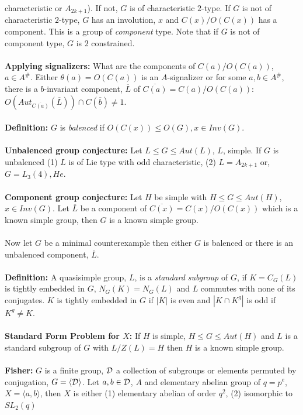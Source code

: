 characteristic or $A_{2k+1}$).  If not, $G$ is of characteristic $2$-type.  If $G$ is not of characteristic $2$-type, $G$
has an involution, $x$ and $C(x)/O(C(x))$ has a component.  This is a group of \emph{component} type.  Note that if
$G$ is not of component type, $G$ is $2$ constrained.
\\
\\
{\bf Applying signalizers:}  What are the components of $C(a)/O(C(a))$, $a \in A^{\#}$.  Either $\theta(a)=O(C(a))$ is
an $A$-signalizer or for some $a,b \in A^{\#}$, there is a $b$-invariant component, ${\overline L}$ of
${\overline {C(a)}}= C(a)/O(C(a))$: $O(Aut_{\overline {C(a)}}({\overline L})) \cap C({\overline b}) \ne 1$.
\\
\\
{\bf Definition:} $G$ is \emph{balenced} if $O(C(x)) \leq O(G), x \in Inv(G)$.\\
\\
{\bf Unbalenced group conjecture:} Let $L \leq G \leq Aut(L)$, $L$, simple.   If $G$ is unbalenced
(1) $L$ is of Lie type with odd characteristic, (2) $L=A_{2k+1}$ or, $G=L_3(4), He$.
\\
\\
{\bf Component group conjecture:} Let $H$ be simple with $H \leq G \leq Aut(H)$, $x \in Inv(G)$.  Let ${\overline L}$
be a component of ${\overline {C(x)}} = C(x)/O(C(x))$ which is a known simple group, then $G$ is a known simple group.\\
\\
Now let $G$ be a minimal counterexample then either $G$ is balenced or there is an unbalenced component, ${\overline L}$.
\\
\\
{\bf Definition:} A quasisimple group, $L$, is a \emph{standard subgroup} of $G$, if $K=C_G(L)$ is
tightly embedded in $G$, $N_G(K)=N_G(L)$ and $L$ commutes with none of its conjugates.
$K$ is tightly embedded in $G$ if $|K|$ is even and $|K \cap K^g|$ is odd if $K^g \ne K$.
\\
\\
{\bf Standard Form Problem for $X$:}  If $H$ is simple, $H \leq G \leq Aut(H)$ and $L$ is a standard subgroup of $G$
with $L/Z(L) = H$ then $H$ is a known simple group.
\\
\\
{\bf Fisher:} $G$ is a finite group, ${\cal D}$ a collection of subgroups or elements permuted by conjugation, 
$G = \langle {\cal D} \rangle$.  Let $a,b \in {\cal D}$, $A$ and elementary abelian group of $q=p^e$,
$X= \langle a, b \rangle$, then $X$ is either (1) elementary abelian of order $q^2$, (2) isomorphic to $SL_2(q)$
